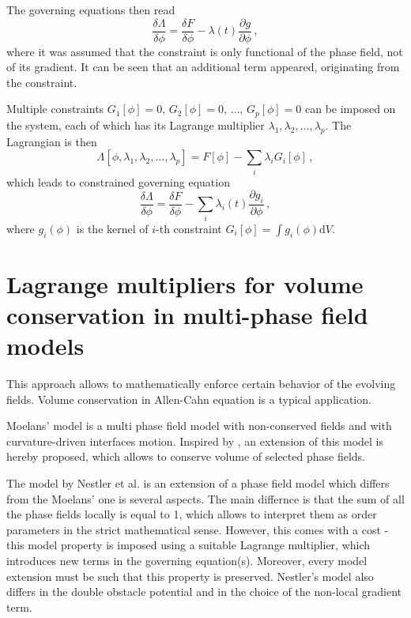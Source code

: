 The governing equations then read
\begin{equation}
\frac{\delta \Lambda}{\delta \phi} = \frac{\delta F}{\delta \phi} - \lambda(t)\frac{\partial g}{\partial \phi}\,, 
\end{equation}
where it was assumed that the constraint is only functional of the phase field, not of its gradient. It can be seen that an additional term appeared, originating from the constraint. 

Multiple constraints $G_1[\phi]=0,\,G_2[\phi]=0,\, \dots,\,G_p[\phi]=0$ can be imposed on the system, each of which has its Lagrange multiplier $\lambda_1,\lambda_2,\dots,\lambda_p$. The Lagrangian is then 
\begin{equation}
\Lambda[\phi,\lambda_1,\lambda_2,\dots,\lambda_p] = F[\phi] - \sum_i\lambda_i
G_i[\phi] \,,
\end{equation}
which leads to constrained governing equation
\begin{equation}
\frac{\delta \Lambda}{\delta \phi} = \frac{\delta F}{\delta \phi} - \sum_i\lambda_i(t)\frac{\partial g_i}{\partial \phi} \,,
\end{equation}
where $g_i(\phi)$ is the kernel of $i$-th constraint $G_i[\phi]=\int g_i(\phi)\mathrm{d}V$. 

\section*{Lagrange multipliers for volume conservation in multi-phase field models}
This approach allows to mathematically enforce certain behavior of the evolving fields. Volume conservation in Allen-Cahn equation is a typical application.

Moelans' model is a multi phase field model with non-conserved fields and with curvature-driven interfaces motion. Inspired by \cite{Nestler2008}, an extension of this model is hereby proposed, which allows to conserve volume of selected phase fields.

The model by Nestler et al. \cite{Nestler2008} is an extension of a phase field model which differs from the Moelans' one is several aspects. The main differnce is that the sum of all the phase fields locally is equal to 1, which allows to interpret them as order parameters in the strict mathematical sense. However, this comes with a cost - this model property is imposed using a suitable Lagrange multiplier, which introduces new terms in the governing equation(s). Moreover, every model extension must be such that this property is preserved. Nestler's model also differs in the double obstacle potential and in the choice of the non-local gradient term.  

